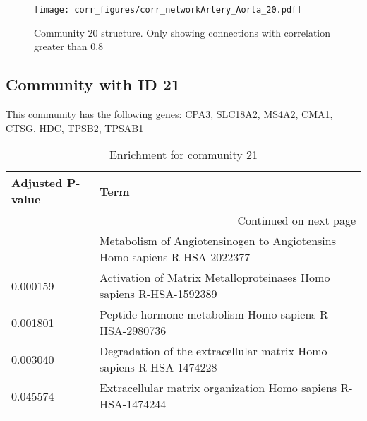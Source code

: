 \begin{figure}[h!]
\centering
\texttt{[image: corr\_figures/corr\_networkArtery\_Aorta\_20.pdf]}
\caption{Community 20 structure. Only showing connections with correlation greater than 0.8}
\end{figure}




\subsection*{Community with ID 21}
This community has the following genes: CPA3, SLC18A2, MS4A2, CMA1, CTSG, HDC, TPSB2, TPSAB1
\\
\begin{longtable}{p{2.4cm}p{14.5cm}}
\caption{Enrichment for community 21}\\
\toprule
Adjusted \newline P-value &                                                                      Term \\
\midrule
\endhead
\midrule
\multicolumn{2}{r}{{Continued on next page}} \\
\midrule
\endfoot

\bottomrule
\endlastfoot
                 0.000036 &  Metabolism of Angiotensinogen to Angiotensins Homo sapiens R-HSA-2022377 \\
                 0.000159 &        Activation of Matrix Metalloproteinases Homo sapiens R-HSA-1592389 \\
                 0.001801 &                     Peptide hormone metabolism Homo sapiens R-HSA-2980736 \\
                 0.003040 &        Degradation of the extracellular matrix Homo sapiens R-HSA-1474228 \\
                 0.045574 &              Extracellular matrix organization Homo sapiens R-HSA-1474244 \\
\end{longtable}



